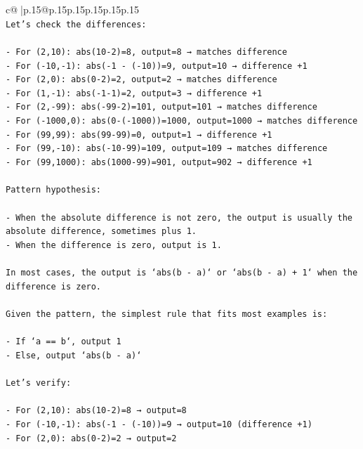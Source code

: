 \documentclass{article}
\begin{document}
{\begin{supertabular}{c@{$\;$}|p{.15\linewidth}@{}p{.15\linewidth}p{.15\linewidth}p{.15\linewidth}p{.15\linewidth}p{.15\linewidth}}
{{{\\ 
\texttt{Let's check the differences:} \\
\\ 
\texttt{{-} For (2,10): abs(10{-}2)=8, output=8 → matches difference} \\
\texttt{{-} For ({-}10,{-}1): abs({-}1 {-} ({-}10))=9, output=10 → difference +1} \\
\texttt{{-} For (2,0): abs(0{-}2)=2, output=2 → matches difference} \\
\texttt{{-} For (1,{-}1): abs({-}1{-}1)=2, output=3 → difference +1} \\
\texttt{{-} For (2,{-}99): abs({-}99{-}2)=101, output=101 → matches difference} \\
\texttt{{-} For ({-}1000,0): abs(0{-}({-}1000))=1000, output=1000 → matches difference} \\
\texttt{{-} For (99,99): abs(99{-}99)=0, output=1 → difference +1} \\
\texttt{{-} For (99,{-}10): abs({-}10{-}99)=109, output=109 → matches difference} \\
\texttt{{-} For (99,1000): abs(1000{-}99)=901, output=902 → difference +1} \\
\\ 
\texttt{Pattern hypothesis:} \\
\\ 
\texttt{{-} When the absolute difference is not zero, the output is usually the absolute difference, sometimes plus 1.} \\
\texttt{{-} When the difference is zero, output is 1.} \\
\\ 
\texttt{In most cases, the output is `abs(b {-} a)` or `abs(b {-} a) + 1` when the difference is zero.} \\
\\ 
\texttt{Given the pattern, the simplest rule that fits most examples is:} \\
\\ 
\texttt{{-} If `a == b`, output 1} \\
\texttt{{-} Else, output `abs(b {-} a)`} \\
\\ 
\texttt{Let's verify:} \\
\\ 
\texttt{{-} For (2,10): abs(10{-}2)=8 → output=8} \\
\texttt{{-} For ({-}10,{-}1): abs({-}1 {-} ({-}10))=9 → output=10 (difference +1)} \\
\texttt{{-} For (2,0): abs(0{-}2)=2 → output=2} \\
}}}
\end{supertabular}}
\end{document}
